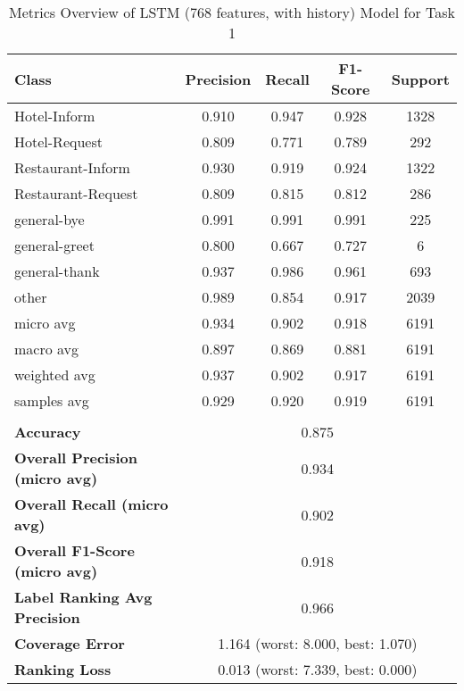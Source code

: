 
\begin{table}[H] %

\centering

\begin{tabular}{|l|c|c|c|c|}
\hline
\textbf{Class}& \textbf{Precision} & \textbf{Recall} & \textbf{F1-Score} & \textbf{Support} \\ \hline
Hotel-Inform & 0.910 & 0.947 & 0.928 & 1328 \\ \hline
Hotel-Request & 0.809 & 0.771 & 0.789 & 292 \\ \hline
Restaurant-Inform & 0.930 & 0.919 & 0.924 & 1322 \\ \hline
Restaurant-Request & 0.809 & 0.815 & 0.812 & 286 \\ \hline
general-bye & 0.991 & 0.991 & 0.991 & 225 \\ \hline
general-greet & 0.800 & 0.667 & 0.727 & 6 \\ \hline
general-thank & 0.937 & 0.986 & 0.961 & 693 \\ \hline
other & 0.989 & 0.854 & 0.917 & 2039 \\ \hline\hline
micro avg & 0.934 & 0.902 & 0.918 & 6191 \\ \hline
macro avg & 0.897 & 0.869 & 0.881 & 6191 \\ \hline
weighted avg & 0.937 & 0.902 & 0.917 & 6191 \\ \hline
samples avg & 0.929 & 0.920 & 0.919 & 6191 \\ \hline
\multicolumn{5}{c}{}\\ \hline

\textbf{Accuracy}                      & \multicolumn{4}{c|}{0.875}                                 \\ \hline
\textbf{Overall Precision (micro avg)} & \multicolumn{4}{c|}{0.934}                                \\ \hline
\textbf{Overall Recall (micro avg)}    & \multicolumn{4}{c|}{0.902}                                   \\ \hline
\textbf{Overall F1-Score (micro avg)}  & \multicolumn{4}{c|}{0.918}                                  \\ \hline
\textbf{Label Ranking Avg Precision}   & \multicolumn{4}{c|}{0.966}                                    \\ \hline
\textbf{Coverage Error}                & \multicolumn{4}{c|}{1.164 (worst: 8.000, best: 1.070)}                             \\ \hline
\textbf{Ranking Loss}                  & \multicolumn{4}{c|}{0.013 (worst: 7.339, best: 0.000)}                             \\ \hline
\end{tabular}

\caption{Metrics Overview of LSTM (768 features, with history) Model for Task 1}
\label{table:LSTM (768 features, with history)_metrics_task_1}
\end{table}
    